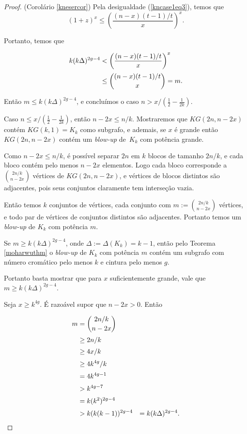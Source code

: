 \begin{proof}{(Corolário \ref{knesercor})}
Pela desigualdade (\ref{kncase1eq3}), temos que \[(1+z)^x \leq \left(\frac{(n-x)(t-1)/t}{x}\right)^x.\]

Portanto, temos que

\begin{equation*}
\setlength{\jot}{5pt}
\begin{aligned}
k(k\Delta)^{2g-4} & < \left(\frac{(n-x)(t-1)/t}{x}\right)^x \\
 & \leq \binom{(n-x)(t-1)/t}{x} = m.
\end{aligned}
\end{equation*}

Então $m \leq k(k\Delta)^{2g-4}$, e concluímos o caso $n > x/(\frac{1}{2} - \frac{1}{2k})$.

Caso $n \leq x/(\frac{1}{2} - \frac{1}{2k})$, então $n-2x \leq n/k$. Mostraremos que $KG(2n,n-2x)$ contém $KG(k,1) = K_k$ como subgrafo, e ademais, se $x$ é grande então $KG(2n,n-2x)$ contém um \textit{blow-up} de~$K_k$ com potência grande.

Como $n-2x \leq n/k$, é possível separar $2n$ em $k$ blocos de tamanho $2n/k$, e cada bloco contém pelo menos $n-2x$ elementos. Logo cada bloco corresponde a $\binom{2n/k}{n-2x}$ vértices de $KG(2n, n-2x)$, e vértices de blocos distintos são adjacentes, pois seus conjuntos claramente tem interseção vazia.

Então temos $k$ conjuntos de vértices, cada conjunto com $m := \binom{2n/k}{n-2x}$ vértices, e todo par de vértices de conjuntos distintos são adjacentes. Portanto temos um \textit{blow-up} de $K_k$ com potência $m$.

Se $m \geq k(k\Delta)^{2g-4}$, onde $\Delta := \Delta(K_k) = k-1$, então pelo Teorema \ref{moharwuthm} o \textit{blow-up} de $K_k$ com potência $m$ contém um subgrafo com número cromático pelo menos $k$ e cintura pelo menos $g$.

Portanto basta mostrar que para $x$ suficientemente grande, vale que $m \geq k(k\Delta)^{2g-4}$.

Seja $x\geq k^{4g}$. É razoável supor que $n-2x > 0$. Então

\begin{equation*}
\setlength{\jot}{5pt}
\begin{aligned}
m &= \binom{2n/k}{n-2x}\\
&\geq 2n/k\\
&\geq 4x/k\\
&\geq 4k^{4g}/k\\
&= 4k^{4g-1}\\
&> k^{4g-7}\\
&= k(k^2)^{2g-4}\\
&> k(k(k-1))^{2g-4}&= k(k\Delta)^{2g-4}.
\end{aligned}
\end{equation*}


\end{proof}
